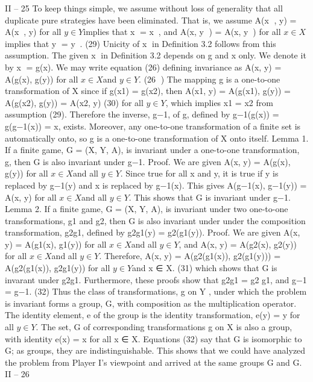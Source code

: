 \documentclass[]{report}
\begin{document}
II – 25
To keep things simple, we assume without loss of generality that all duplicate pure
strategies have been eliminated. That is, we assume
A(x
, y) = A(x, y) for all $ y \in Y$implies that x = x, and
A(x, y
) = A(x, y) for all $ x \in X$implies that y = y. (29)
Unicity of x in Definition 3.2 follows from this assumption.
The given x in Definition 3.2 depends on g and x only. We denote it by x = g(x).
We may write equation (26) defining invariance as
A(x, y) = A(g(x), g(y)) for all $ x \in X$and $ y \in Y$. (26
)
The mapping g is a one-to-one transformation of X since if g(x1) = g(x2), then
A(x1, y) = A(g(x1), g(y)) = A(g(x2), g(y)) = A(x2, y) (30)
for all $ y \in Y$, which implies x1 = x2 from assumption (29). Therefore the inverse, g−1, of
g, defined by g−1(g(x)) = g(g−1(x)) = x, exists. Moreover, any one-to-one transformation
of a finite set is automatically onto, so g is a one-to-one transformation of X onto itself.
Lemma 1. If a finite game, G = (X, Y, A), is invariant under a one-to-one transformation,
g, then G is also invariant under g−1.
Proof. We are given A(x, y) = A(g(x), g(y)) for all $ x \in X$and all $ y \in Y$. Since true for
all x and y, it is true if y is replaced by g−1(y) and x is replaced by g−1(x). This gives
A(g−1(x), g−1(y)) = A(x, y) for all $ x \in X$and all $ y \in Y$. This shows that G is invariant
under g−1.
Lemma 2. If a finite game, G = (X, Y, A), is invariant under two one-to-one transformations,
g1 and g2, then G is also invariant under under the composition transformation,
g2g1, defined by g2g1(y) = g2(g1(y)).
Proof. We are given A(x, y) = A(g1(x), g1(y)) for all $ x \in X$and all $ y \in Y$, and A(x, y) =
A(g2(x), g2(y)) for all $ x \in X$and all $ y \in Y$. Therefore,
A(x, y) = A(g2(g1(x)), g2(g1(y))) = A(g2(g1(x)), g2g1(y)) for all $ y \in Y$and x ∈ X.
(31)
which shows that G is invarant under g2g1.
Furthermore, these proofs show that
g2g1 = g2 g1, and g−1 = g−1. (32)
Thus the class of transformations, g on Y , under which the problem is invariant forms a
group, G, with composition as the multiplication operator. The identity element, e of the
group is the identity transformation, e(y) = y for all $ y \in Y$. The set, G of corresponding
transformations g on X is also a group, with identity e(x) = x for all x ∈ X. Equations
(32) say that G is isomorphic to G; as groups, they are indistinguishable.
This shows that we could have analyzed the problem from Player I’s viewpoint and
arrived at the same groups G and G.
II – 26
\end{document}
